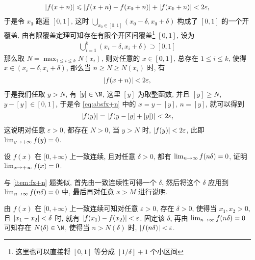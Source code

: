 \begin{exercise}[series=exer]
\begin{answer}
      \begin{align*}
          \abs{f(x + n)} \leqslant \abs{f(x + n) - f(x_{0} + n)} + \abs{f(x_{0} + n)} < 2 \varepsilon,
      \end{align*}
      于是令 $ x_{0} $ 跑遍 $ [0, 1] $, 这时 $ \bigcup_{x_{0} \in [0, 1]} (x_{0} - \delta, x_{0} + \delta) $ 构成了 $ [0, 1] $ 的一个开覆盖, 由有限覆盖定理可知存在有限个开区间覆盖\footnote{这里也可以直接将 $ [0, 1] $ 等分成 $ [1/\delta] + 1 $ 个小区间} $ [0, 1] $, 设为
      \begin{align*}
          \bigcup_{i = 1}^{k} (x_{i} - \delta, x_{i} + \delta) \supset [0, 1]
      \end{align*}
      那么取 $ N = \max_{1 \le i \le k} N(x_{i}) $, 则对任意的 $ x \in [0, 1] $, 总存在 $ 1 \le i \le k $, 使得 $ x \in (x_{i} - \delta, x_{i} + \delta) $, 那么当 $ n \ge N \ge N(x_{i}) $ 时, 有
      \begin{align}\label{eq:absfx+n}
          \abs{f(x + n)} < 2\varepsilon,
      \end{align}
      于是我们任取 $ y > N $, 有 $ [y] \in \N $, 这里 $ [y] $ 为取整函数, 并且 $ [y] \ge N $, $ y - [y] \in [0, 1] $, 于是令 \eqref{eq:absfx+n} 中的 $ x = y - [y] $, $ n = [y] $, 就可以得到
      \begin{align*}
          \abs{f(y)} = \abs{f(y - [y] + [y])} < 2\varepsilon,
      \end{align*}
      这说明对任意 $ \varepsilon > 0 $, 都存在 $ N > 0 $, 当 $ y > N $ 时, $ \abs{f(y)} < 2\varepsilon $, 此即 $ \lim_{y \to +\infty}f(y) = 0 $.
  \end{answer}
  \item 设 $ f(x) $ 在 $ [0, +\infty) $ 上一致连续, 且对任意 $ \delta > 0 $, 都有 $ \lim_{n \to \infty} f(n\delta) = 0 $, 证明 $ \lim_{x \to +\infty} f(x) = 0 $.
  \begin{hint}
      与 \ref{item:fx+n} 题类似, 首先由一致连续性可得一个 $ \delta $, 然后将这个 $ \delta $ 应用到 $ \lim_{n \to \infty} f(n\delta) = 0 $ 中, 最后再对任意 $ x > M $ 进行说明.
  \end{hint}
  \begin{answer}
      由 $ f(x) $ 在 $ [0, +\infty) $ 上一致连续可知对任意 $ \varepsilon > 0 $, 存在 $ \delta > 0 $, 使得当 $ x_{1}, x_{2} > 0 $, 且 $ \abs{x_{1} - x_{2}} < \delta $ 时, 就有 $ \abs{f(x_{1}) - f(x_{2})} < \varepsilon $. 固定该 $ \delta $, 再由 $ \lim_{n \to \infty}f(n\delta) = 0 $ 可知存在 $ N(\delta) \in \N $, 使得当 $ n > N(\delta) $ 时, $ \abs{f(n\delta)} < \varepsilon $.


\end{answer}
\end{exercise}
